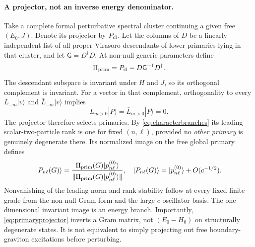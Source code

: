 \documentclass[11pt,a4paper]{article}
\numberwithin{equation}{section}
\theoremstyle{remark}\newtheorem{remark}[theorem]{Remark}
\begin{document}
\paragraph{A projector, not an inverse energy denominator.}
Take a complete formal perturbative spectral cluster continuing a given free $(E_0,J)$. Denote its projector by $P_{\rm cl}$. Let the columns of $D$ be a linearly independent list of all proper Virasoro descendants of lower primaries lying in that cluster, and let $\mathsf G=D^\dagger D$. At non-null generic parameters define
\begin{equation}
 \Pi_{\rm prim}=P_{\rm cl}-D\mathsf G^{-1}D^\dagger.
 \label{eq:primaryprojector}
\end{equation}
The descendant subspace is invariant under $H$ and $J$, so its orthogonal complement is invariant. For a vector in that complement, orthogonality to every $L_{-m}|v\rangle$ and $\bar L_{-m}|v\rangle$ implies
\begin{equation}
 L_{m>0}|P\rangle=\bar L_{m>0}|P\rangle=0.
\end{equation}
The projector therefore selects primaries. By \eqref{eq:characterbranches} its leading scalar-two-particle rank is one for fixed $(n,\ell)$, provided no \emph{other primary} is genuinely degenerate there. Its normalized image on the free global primary defines
\begin{equation}
 |P_{n\ell}(G)\rangle=
 \frac{\Pi_{\rm prim}(G)|p^{(0)}_{n\ell}\rangle}
 {\|\Pi_{\rm prim}(G)|p^{(0)}_{n\ell}\rangle\|},
 \quad |P_{n\ell}(G)\rangle=|p^{(0)}_{n\ell}\rangle+O(c^{-1/2}).
 \label{eq:branchdefinition}
\end{equation}
Nonvanishing of the leading norm and rank stability follow at every fixed finite grade from the non-null Gram form and the large-$c$ oscillator basis. The one-dimensional invariant image is an energy branch. Importantly, \eqref{eq:primaryprojector} inverts a Gram matrix, not $(E_0-H_0)$ on structurally degenerate states. It is not equivalent to simply projecting out free boundary-graviton excitations before perturbing.
\end{document}
